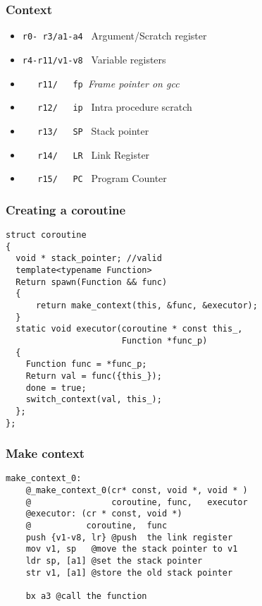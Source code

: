 \documentclass{beamer}
\begin{document}
\begin{frame}[fragile]
\frametitle{Context}
\begin{itemize}
\item<1-> \lstinline[columns=fixed]{r0- r3/a1-a4 } Argument/Scratch register
\item<2-> \lstinline[columns=fixed]{r4-r11/v1-v8 } Variable registers
\item<3-> \lstinline[columns=fixed]{   r11/   fp }\textit{Frame pointer on gcc}
\item<4-> \lstinline[columns=fixed]{   r12/   ip } Intra procedure scratch 
\item<5-> \lstinline[columns=fixed]{   r13/   SP } Stack pointer
\item<6-> \lstinline[columns=fixed]{   r14/   LR } Link Register
\item<7-> \lstinline[columns=fixed]{   r15/   PC } Program Counter
\end{itemize}
\end{frame}

\begin{frame}[fragile]
\frametitle{Creating a coroutine}
\vspace*{-3ex}

\begin{block}{\vspace*{-3.2ex}}
\begin{lstlisting}[basicstyle=\small]
struct coroutine
{
  void * stack_pointer; //valid
  template<typename Function>
  Return spawn(Function && func)
  {
      return make_context(this, &func, &executor);
  }
  static void executor(coroutine * const this_, 
                       Function *func_p)
  {
    Function func = *func_p;
    Return val = func({this_});
    done = true;
    switch_context(val, this_);
  };  
};
\end{lstlisting}
\end{block}
\end{frame}


\begin{frame}[fragile]
\frametitle{Make context}

\begin{block}{\vspace*{-3.2ex}}
\begin{lstlisting}[language=ASM, basicstyle=\small]
make_context_0:
    @_make_context_0(cr* const, void *, void * )
    @                coroutine, func,   executor
    @executor: (cr * const, void *)
    @           coroutine,  func
    push {v1-v8, lr} @push  the link register
    mov v1, sp   @move the stack pointer to v1
    ldr sp, [a1] @set the stack pointer
    str v1, [a1] @store the old stack pointer

    bx a3 @call the function

\end{lstlisting}
\end{block}
\end{frame}
\end{document}
